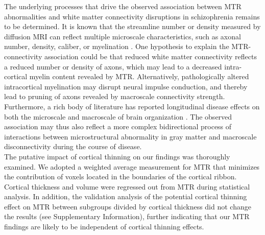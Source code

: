 \begin{refsection}
The underlying processes that drive the observed association between MTR abnormalities and white matter connectivity disruptions in schizophrenia remains to be determined. It is known that the streamline number or density measured by diffusion MRI can reflect multiple microscale characteristics, such as axonal number, density, caliber, or myelination \citep{Jones2013WhiteMI}. One hypothesis to explain the MTR-connectivity association could be that reduced white matter connectivity reflects a reduced number or density of axons, which may lead to a decreased intra-cortical myelin content revealed by MTR. Alternatively, pathologically altered intracortical myelination may disrupt neural impulse conduction, and thereby lead to pruning of axons revealed by macroscale connectivity strength. Furthermore, a rich body of literature has reported longitudinal disease effects on both the microscale and macroscale of brain organization \citep{Bullmore1997TheDN,Catani2005TheRA}. The observed association may thus also reflect a more complex bidirectional process of interactions between microstructural abnormality in gray matter and macroscale disconnectivity during the course of disease. \\

The putative impact of cortical thinning \citep{Goldman2009WidespreadRO,Haren2011ChangesIC} on our findings was thoroughly examined. We adopted a weighted average measurement for MTR that minimizes the contribution of voxels located in the boundaries of the cortical ribbon. Cortical thickness and volume were regressed out from MTR during statistical analysis. In addition, the validation analysis of the potential cortical thinning effect on MTR between subgroups divided by cortical thickness did not change the results (see Supplementary Information), further indicating that our MTR findings are likely to be independent of cortical thinning effects. \\


\end{refsection}
